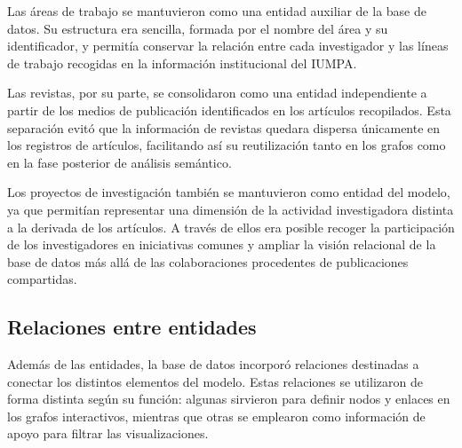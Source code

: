 \documentclass[11pt,spanish,listoffigures,listoftables]{tfgetsinf}
\begin{document}
Las áreas de trabajo se mantuvieron como una entidad auxiliar de la base de datos. Su estructura era sencilla, formada por el nombre del área y su identificador, y permitía conservar la relación entre cada investigador y las líneas de trabajo recogidas en la información institucional del IUMPA.

Las revistas, por su parte, se consolidaron como una entidad independiente a partir de los medios de publicación identificados en los artículos recopilados. Esta separación evitó que la información de revistas quedara dispersa únicamente en los registros de artículos, facilitando así su reutilización tanto en los grafos como en la fase posterior de análisis semántico.

Los proyectos de investigación también se mantuvieron como entidad del modelo, ya que permitían representar una dimensión de la actividad investigadora distinta a la derivada de los artículos. A través de ellos era posible recoger la participación de los investigadores en iniciativas comunes y ampliar la visión relacional de la base de datos más allá de las colaboraciones procedentes de publicaciones compartidas.

\subsection{Relaciones entre entidades}

Además de las entidades, la base de datos incorporó relaciones destinadas a conectar los distintos elementos del modelo. Estas relaciones se utilizaron de forma distinta según su función: algunas sirvieron para definir nodos y enlaces en los grafos interactivos, mientras que otras se emplearon como información de apoyo para filtrar las visualizaciones.
\end{document}
